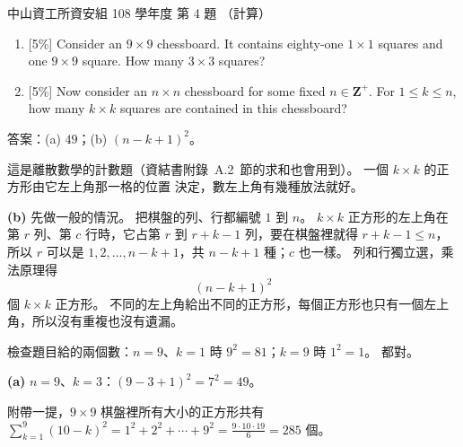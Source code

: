\begin{pastexam}[label={px:nsysu-108-dmalg-02}]{中山資工所資安組 108 學年度 第 4 題}
（計算）

\begin{enumerate}[label=(\alph*)]
\item {[5\%]} Consider an $9\times 9$ chessboard. It contains eighty-one $1\times 1$ squares and one
$9\times 9$ square. How many $3\times 3$ squares?
\item {[5\%]} Now consider an $n\times n$ chessboard for some fixed $n\in\mathbf{Z}^+$. For
$1\le k\le n$, how many $k\times k$ squares are contained in this chessboard?
\end{enumerate}
\end{pastexam}

\begin{pastsoln}
答案：(a) $49$；(b) $(n - k + 1)^2$。

這是離散數學的計數題（資結書附錄~A.2~節的求和也會用到）。 一個 $k \times k$ 的正方形由它左上角那一格的位置
決定，數左上角有幾種放法就好。

\textbf{(b)} 先做一般的情況。 把棋盤的列、行都編號 $1$ 到 $n$。 $k \times k$ 正方形的左上角在第 $r$ 列、第
$c$ 行時，它占第 $r$ 到 $r + k - 1$ 列，要在棋盤裡就得 $r + k - 1 \le n$，所以 $r$ 可以是
$1, 2, \ldots, n - k + 1$，共 $n - k + 1$ 種；$c$ 也一樣。 列和行獨立選，乘法原理得
\[
(n - k + 1)^2
\]
個 $k \times k$ 正方形。 不同的左上角給出不同的正方形，每個正方形也只有一個左上角，所以沒有重複也沒有遺漏。

檢查題目給的兩個數：$n = 9$、$k = 1$ 時 $9^2 = 81$；$k = 9$ 時 $1^2 = 1$。 都對。

\textbf{(a)} $n = 9$、$k = 3$：$(9 - 3 + 1)^2 = 7^2 = 49$。

附帶一提，$9 \times 9$ 棋盤裡所有大小的正方形共有
$\sum_{k=1}^{9} (10 - k)^2 = 1^2 + 2^2 + \cdots + 9^2 = \frac{9 \cdot 10 \cdot 19}{6} = 285$ 個。
\end{pastsoln}

